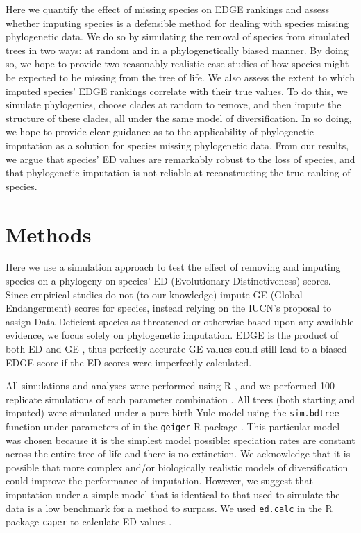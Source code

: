 \documentclass[12pt,english]{article}
\begin{document}
Here we quantify the effect of missing species on EDGE rankings and assess
whether imputing species is a defensible method for dealing with species missing
phylogenetic data. We do so by simulating the removal of species from simulated
trees in two ways: at random and in a phylogenetically biased manner. By doing
so, we hope to provide two reasonably realistic case-studies of how species
might be expected to be missing from the tree of life. We also assess the extent
to which imputed species' EDGE rankings correlate with their true values. To do
this, we simulate phylogenies, choose clades at random to remove, and then
impute the structure of these clades, all under the same model of
diversification. In so doing, we hope to provide clear guidance as to the
applicability of phylogenetic imputation as a solution for species missing
phylogenetic data. From our results, we argue that species' ED values are
remarkably robust to the loss of species, and that phylogenetic imputation is
not reliable at reconstructing the true ranking of species.

\section*{Methods}

Here we use a simulation approach to test the effect of removing and imputing
species on a phylogeny on species' ED (Evolutionary Distinctiveness) scores.
Since empirical studies do not (to our knowledge) impute GE (Global
Endangerment) scores for species, instead relying on the IUCN's proposal to
assign Data Deficient species as threatened or otherwise based upon any
available evidence, we focus solely on phylogenetic imputation. EDGE is the
product of both ED and GE \autocite[see]{Isaac2007}, thus perfectly accurate GE values could still lead to
a biased EDGE score if the ED scores were imperfectly calculated.

All simulations and analyses were performed using R \autocite[version
3.4.0;][]{R2017}, and we performed 100 replicate simulations of each parameter
combination . All trees (both starting and imputed) were simulated under a
pure-birth Yule model using the \texttt{sim.bdtree} function under parameters of
 in the \texttt{geiger} R package \autocite{Pennell2014}. 
This particular model was chosen because it is the simplest model possible:
speciation rates are constant across the entire tree of life and there is no
extinction. We acknowledge that it is possible that more complex and/or
biologically realistic models of diversification could improve the performance
of imputation. However, we suggest that imputation under a simple model that is
identical to that used to simulate the data is a low benchmark for a method to
surpass. We used \texttt{ed.calc} in the R package \texttt{caper} to calculate
ED values \autocite{Orme2013}.
\end{document}
